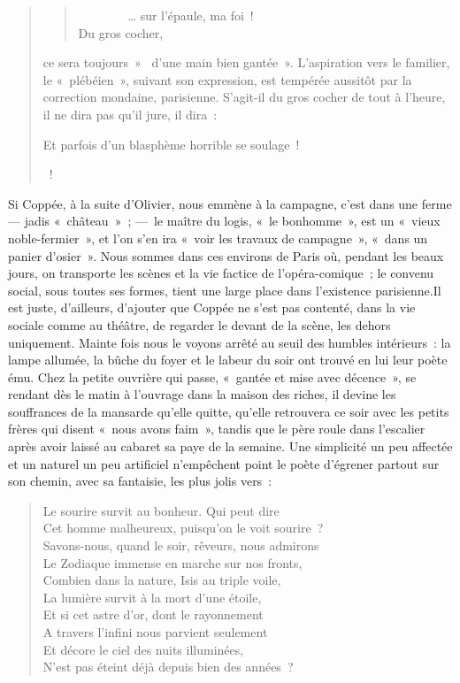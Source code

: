 \documentclass[french,twoside]{book} %
\begin{document}
\begin{verse}
{\begin{verse}
        … sur l’épaule, ma foi !\\
Du gros cocher,\\
\end{verse}
\par
\noindent ce sera toujours »  d’une main bien gantée ». L’aspiration vers le familier, le « plébéien », suivant son expression, est tempérée aussitôt par la correction mondaine, parisienne. S’agit-il du gros cocher de tout à l’heure, il ne dira pas qu’il jure, il dira :\par
Et parfois d’un blasphème horrible se soulage !\\
} !\\
\end{verse}

\noindent Si Coppée, à la suite d’Olivier, nous emmène à la campagne, c’est dans une ferme — jadis « château » ; — le maître du logis, « le bonhomme », est un « vieux noble-fermier », et l’on s’en ira « voir les travaux de campagne », « dans un panier d’osier ». Nous sommes dans ces environs de Paris où, pendant les beaux jours, on transporte les scènes et la vie factice de l’opéra-comique ; le convenu social, sous toutes ses formes, tient une large place dans l’existence parisienne.Il est juste, d’ailleurs, d’ajouter que Coppée ne s’est pas contenté, dans la vie sociale comme au théâtre, de regarder le devant de la scène, les dehors uniquement. Mainte fois nous le voyons arrêté au seuil des humbles intérieurs : la lampe allumée, la bûche du foyer et le labeur du soir ont trouvé en lui leur poète ému. Chez la petite ouvrière qui passe, « gantée et mise avec décence », se rendant dès le matin à l’ouvrage dans la maison des riches, il devine les souffrances de la mansarde qu’elle quitte, qu’elle retrouvera ce soir avec les petits frères qui disent « nous avons faim », tandis que le père roule dans l’escalier après avoir laissé au cabaret sa paye de la semaine. Une simplicité un peu affectée et un naturel un peu artificiel n’empêchent point le poète d’égrener partout sur son chemin, avec sa fantaisie, les plus jolis vers :\par


\begin{verse}
Le sourire survit au bonheur. Qui peut dire\\
Cet homme malheureux, puisqu’on le voit sourire ?\\
Savons-nous, quand le soir, rêveurs, nous admirons\\
Le Zodiaque immense en marche sur nos fronts,\\
Combien dans la nature, Isis au triple voile,\\
La lumière survit à la mort d’une étoile,\\
Et si cet astre d’or, dont le rayonnement\\
A travers l’infini nous parvient seulement\\
Et décore le ciel des nuits illuminées,\\
N’est pas éteint déjà depuis bien des années ?\\
\end{verse}
\end{document}
